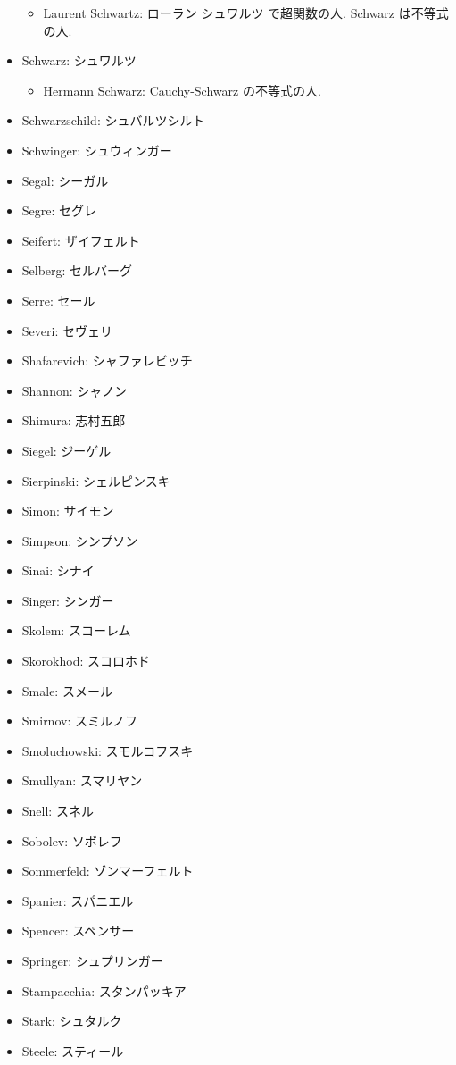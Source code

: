 \documentclass[openany, a4paper, oneside]{jsbook}
\begin{document}
\begin{itemize}
\begin{itemize}
\item Laurent Schwartz: ローラン シュワルツ で超関数の人. Schwarz は不等式の人.
\end{itemize}
\item Schwarz: シュワルツ
\begin{itemize}
\item Hermann Schwarz: Cauchy-Schwarz の不等式の人.
\end{itemize}
\item Schwarzschild: シュバルツシルト
\item Schwinger: シュウィンガー
\item Segal: シーガル
\item Segre: セグレ
\item Seifert: ザイフェルト
\item Selberg: セルバーグ
\item Serre: セール
\item Severi: セヴェリ
\item Shafarevich: シャファレビッチ
\item Shannon: シャノン
\item Shimura: 志村五郎
\item Siegel: ジーゲル
\item Sierpinski: シェルピンスキ
\item Simon: サイモン
\item Simpson: シンプソン
\item Sinai: シナイ
\item Singer: シンガー
\item Skolem: スコーレム
\item Skorokhod: スコロホド
\item Smale: スメール
\item Smirnov: スミルノフ
\item Smoluchowski: スモルコフスキ
\item Smullyan: スマリヤン
\item Snell: スネル
\item Sobolev: ソボレフ
\item Sommerfeld: ゾンマーフェルト
\item Spanier: スパニエル
\item Spencer: スペンサー
\item Springer: シュプリンガー
\item Stampacchia: スタンパッキア
\item Stark: シュタルク
\item Steele: スティール

\end{itemize}
\end{document}

